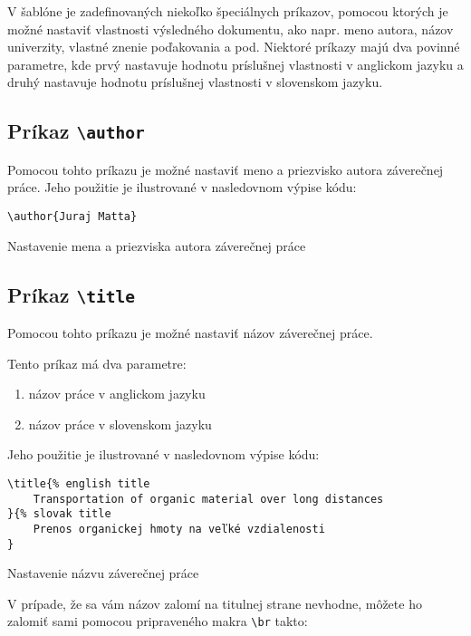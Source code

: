 V šablóne je zadefinovaných niekoľko špeciálnych príkazov, pomocou ktorých je možné nastaviť vlastnosti výsledného dokumentu, ako napr. meno autora, názov univerzity, vlastné znenie poďakovania a pod. Niektoré príkazy majú dva povinné parametre, kde prvý nastavuje hodnotu príslušnej vlastnosti v anglickom jazyku a druhý nastavuje hodnotu príslušnej vlastnosti v slovenskom jazyku.

\subsection{Príkaz {\tt \textbackslash{}author}}

Pomocou tohto príkazu je možné nastaviť meno a priezvisko autora záverečnej práce. Jeho použitie je ilustrované v nasledovnom výpise kódu:

\begin{listing}[ht]
\begin{verbatim}
\author{Juraj Matta}
\end{verbatim}
\caption{Nastavenie mena a priezviska autora záverečnej práce}
\end{listing}


\subsection{Príkaz {\tt \textbackslash{}title}}

Pomocou tohto príkazu je možné nastaviť názov záverečnej práce. 

Tento príkaz má dva parametre:
\begin{enumerate}
    \item názov práce v anglickom jazyku
    \item názov práce v slovenskom jazyku
\end{enumerate}

Jeho použitie je ilustrované v nasledovnom výpise kódu:

\begin{listing}[ht]
\begin{verbatim}
\title{% english title
    Transportation of organic material over long distances
}{% slovak title
    Prenos organickej hmoty na veľké vzdialenosti
}
\end{verbatim}
\caption{Nastavenie názvu záverečnej práce}
\end{listing}

V prípade, že sa vám názov zalomí na titulnej strane nevhodne, môžete ho zalomiť sami pomocou pripraveného makra {\tt \textbackslash{}br} takto:


